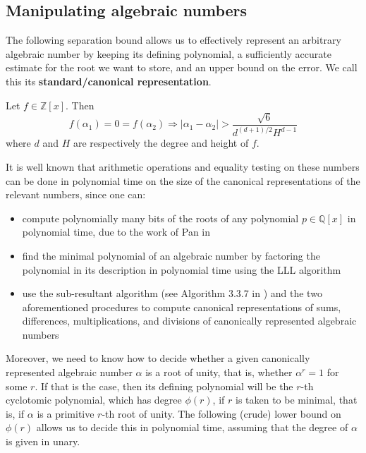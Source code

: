 \subsection{Manipulating algebraic numbers}

The following separation bound allows us to effectively represent an arbitrary algebraic number by keeping its defining polynomial, a sufficiently accurate estimate for the root we want to store, and an upper bound on the error. We call this its \textbf{standard/canonical representation}.

\begin{lemma}[Mignotte]
Let $f\in\mathbb{Z}[x]$. Then
\begin{equation}
f(\alpha_1)=0=f(\alpha_2)\Rightarrow \lvert \alpha_1-\alpha_2\rvert>\frac{\sqrt{6}}{d^{(d+1)/2}H^{d-1}}
\end{equation}
where $d$ and $H$ are respectively the degree and height of $f$.
\end{lemma}

It is well known that arithmetic operations and equality testing on these numbers can be done in polynomial time on the size of the canonical representations of the relevant numbers, since one can:
\begin{itemize}
\item compute polynomially many bits of the roots of any polynomial $p\in\mathbb{Q}[x]$ in polynomial time, due to the work of Pan in \cite{Pan97}
\item find the minimal polynomial of an algebraic number by factoring the polynomial in its description in polynomial time using the LLL algorithm \cite{LenstraLenstraLovasz1982}
\item use the sub-resultant algorithm (see Algorithm 3.3.7 in \cite{Coh93}) and the two aforementioned procedures to compute canonical representations of sums, differences, multiplications, and divisions of canonically represented algebraic numbers
\end{itemize}

Moreover, we need to know how to decide whether a given canonically represented algebraic number $\alpha$ is a root of unity, that is, whether $\alpha^r=1$ for some $r$. If that is the case, then its defining polynomial will be the $r$-th cyclotomic polynomial, which has degree $\phi(r)$, if $r$ is taken to be minimal, that is, if $\alpha$ is a primitive $r$-th root of unity. The following (crude) lower bound on $\phi(r)$ allows us to decide this in polynomial time, assuming that the degree of $\alpha$ is given in unary.

